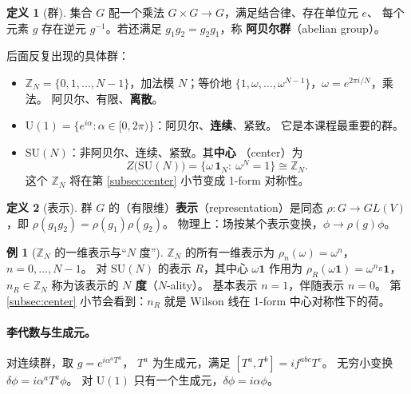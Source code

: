 \documentclass[UTF8,a4paper,11pt]{ctexart}
\theoremstyle{plain}
\theoremstyle{definition}
\newtheorem{definition}{定义}[section]
\newtheorem{example}{例}[section]
\theoremstyle{remark}
\newcommand{\ZZ}{\mathbb{Z}}
\newcommand{\Uone}{\mathrm{U}(1)}
\newcommand{\SUgrp}{\mathrm{SU}}
\newcommand{\en}[1]{\textsf{#1}}       %
\begin{document}
\begin{definition}[群]
集合 $G$ 配一个乘法 $G\times G\to G$，满足结合律、存在单位元 $e$、
每个元素 $g$ 存在逆元 $g^{-1}$。若还满足 $g_1g_2=g_2g_1$，称
\textbf{阿贝尔群}（\en{abelian group}）。
\end{definition}

后面反复出现的具体群：

\begin{itemize}
  \item $\ZZ_N=\{0,1,\dots,N-1\}$，加法模 $N$；等价地
        $\{1,\omega,\dots,\omega^{N-1}\}$，$\omega=e^{2\pi i/N}$，乘法。
        阿贝尔、有限、\textbf{离散}。
  \item $\Uone=\{e^{i\alpha}:\alpha\in[0,2\pi)\}$：阿贝尔、\textbf{连续}、紧致。
        它是本课程最重要的群。
  \item $\SUgrp(N)$：非阿贝尔、连续、紧致。其\textbf{中心}
        （\en{center}）为
        \begin{equation}
          Z\big(\SUgrp(N)\big)
          =\Big\{\omega\,\mathbf 1_N:\ \omega^N=1\Big\}\cong\ZZ_N .
          \label{eq:center}
        \end{equation}
        这个 $\ZZ_N$ 将在第 \ref{subsec:center} 小节变成 1-form 对称性。
\end{itemize}

\begin{definition}[表示]
群 $G$ 的（有限维）\textbf{表示}（\en{representation}）是同态
$\rho:G\to GL(V)$，即 $\rho(g_1g_2)=\rho(g_1)\rho(g_2)$。
物理上：场按某个表示变换，$\phi\to\rho(g)\phi$。
\end{definition}

\begin{example}[$\ZZ_N$ 的一维表示与“$N$ 度”]
\label{ex:Nality}
$\ZZ_N$ 的所有一维表示为 $\rho_n(\omega)=\omega^n$，$n=0,\dots,N-1$。
对 $\SUgrp(N)$ 的表示 $R$，其中心 $\omega\mathbf 1$ 作用为
$\rho_R(\omega\mathbf 1)=\omega^{n_R}\mathbf 1$，
$n_R\in\ZZ_N$ 称为该表示的 \textbf{$N$ 度}（\en{$N$-ality}）。
基本表示 $n=1$，伴随表示 $n=0$。
第 \ref{subsec:center} 小节会看到：$n_R$ 就是 Wilson 线在
1-form 中心对称性下的荷。
\end{example}

\paragraph{李代数与生成元。}对连续群，取 $g=e^{i\alpha^aT^a}$，
$T^a$ 为生成元，满足 $[T^a,T^b]=if^{abc}T^c$。
无穷小变换 $\delta\phi=i\alpha^aT^a\phi$。
对 $\Uone$ 只有一个生成元，$\delta\phi=i\alpha\phi$。
\end{document}
